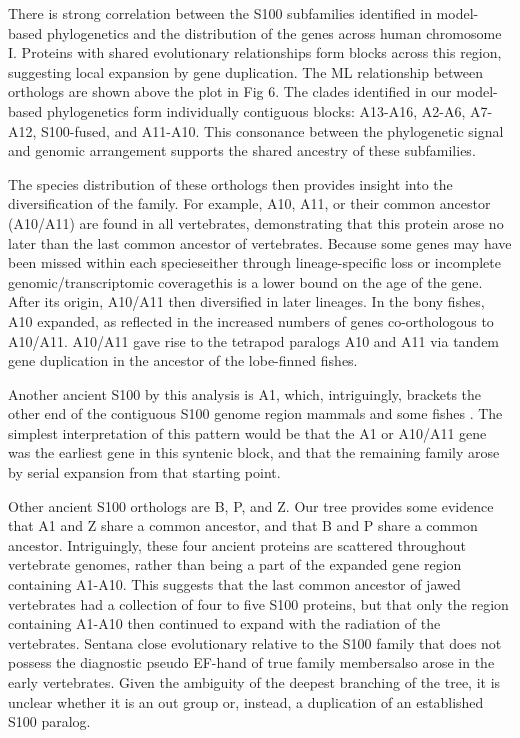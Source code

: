 There is strong correlation between the S100 subfamilies identified
in model-based phylogenetics and the distribution of the genes across
human chromosome I. Proteins with shared evolutionary relationships
form blocks across this region, suggesting local expansion by gene
duplication. The ML relationship between orthologs are shown above
the plot in Fig 6. The clades identified in our model-based phylogenetics
form individually contiguous blocks: A13-A16, A2-A6, A7-A12, S100-fused,
and A11-A10. This consonance between the phylogenetic signal and genomic
arrangement supports the shared ancestry of these subfamilies.

The species distribution of these orthologs then provides insight
into the diversification of the family. For example, A10, A11, or
their common ancestor (A10/A11) are found in all vertebrates, demonstrating
that this protein arose no later than the last common ancestor of
vertebrates. Because some genes may have been missed within each species\textemdash either
through lineage-specific loss or incomplete genomic/transcriptomic
coverage\textemdash this is a lower bound on the age of the gene.
After its origin, A10/A11 then diversified in later lineages. In the
bony fishes, A10 expanded, as reflected in the increased numbers of
genes co-orthologous to A10/A11. A10/A11 gave rise to the tetrapod
paralogs A10 and A11 via tandem gene duplication in the ancestor of
the lobe-finned fishes.

Another ancient S100 by this analysis is A1, which, intriguingly,
brackets the other end of the contiguous S100 genome region mammals
and some fishes \cite{shang_chromosomal_2008}. The simplest interpretation
of this pattern would be that the A1 or A10/A11 gene was the earliest
gene in this syntenic block, and that the remaining family arose by
serial expansion from that starting point.

Other ancient S100 orthologs are B, P, and Z. Our tree provides some
evidence that A1 and Z share a common ancestor, and that B and P share
a common ancestor. Intriguingly, these four ancient proteins are scattered
throughout vertebrate genomes, rather than being a part of the expanded
gene region containing A1-A10. This suggests that the last common
ancestor of jawed vertebrates had a collection of four to five S100
proteins, but that only the region containing A1-A10 then continued
to expand with the radiation of the vertebrates. Sentan\textemdash a
close evolutionary relative to the S100 family that does not possess
the diagnostic pseudo EF-hand of true family members\textemdash also
arose in the early vertebrates. Given the ambiguity of the deepest
branching of the tree, it is unclear whether it is an out group or,
instead, a duplication of an established S100 paralog.


